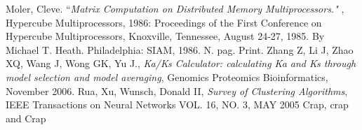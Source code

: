 \documentclass[12pt]{article}
\begin{document}
\begin{thebibliography}{1}
Moler, Cleve. ``\emph{Matrix Computation on Distributed Memory Multiprocessors."
}, Hypercube Multiprocessors, 1986: Proceedings of the First Conference on
Hypercube Multiprocessors, Knoxville, Tennessee, August 24-27, 1985. By Michael
T. Heath. Philadelphia: SIAM, 1986. N. pag. Print.
Zhang Z, Li J, Zhao XQ, Wang J, Wong GK, Yu J., \emph{Ka/Ks Calculator: 
calculating Ka and Ks through model selection and model averaging},
Genomics Proteomics Bioinformatics, November 2006.
Rua, Xu, Wunsch, Donald II, \emph{Survey of Clustering Algorithms},
IEEE Transactions on Neural Networks VOL. 16, NO. 3, MAY 2005
Crap, crap and Crap
\end{thebibliography}
\end{document}
